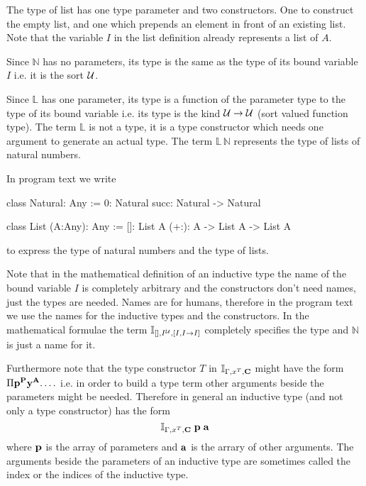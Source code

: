 \begin{description}
  The type of list has one type parameter and two constructors. One to
  construct the empty list, and one which prepends an element in front of an
  existing list. Note that the variable $I$ in the list definition already
  represents a list of $A$.

  Since $\mathbb{N}$ has no parameters, its type is the same as the type of
  its bound variable $I$ i.e. it is the sort ${\cal{U}}$.

  Since $\mathbb{L}$ has one parameter, its type is a function of the
  parameter type to the type of its bound variable i.e. its type is the kind
  ${\cal{U}} \to {\cal{U}}$ (sort valued function type). The term $\mathbb{L}$ is not a
  type, it is a type constructor which needs one argument to generate an
  actual type. The term $\mathbb{L} \, \mathbb{N}$ represents the type of
  lists of natural numbers.

  In program text we write
  \begin{alba}
      class Natural: Any
      :=
            0: Natural
            succ: Natural -> Natural

      class List (A:Any): Any :=
            []: List A
            (+:): A -> List A -> List A
  \end{alba}
  to express the type of natural numbers and the type of lists.

  Note that in the mathematical definition of an inductive type the name of
  the bound variable $I$ is completely arbitrary and the constructors don't
  need names, just the types are needed. Names are for humans, therefore in
  the program text we use the names for the inductive types and the
  constructors. In the mathematical formulae the term
  $\mathbb{I}_{[], I^{\cal{U}}, [I, I \to I]}$ completely specifies the type and
  $\mathbb{N}$ is just a name for it.

  Furthermore note that the type constructor $T$ in $\mathbb{I}_{\Gamma, x^T,
  \mathbf{C}}$ might have the form $\Pi \mathbf{p}^{\mathbf{P}} \mathbf{y}^{\mathbf{A}}. \ldots$ i.e. in
  order to build a type term other arguments beside the parameters might be
  needed.  Therefore in general an inductive type (and not only a type
  constructor) has the form $$ \mathbb{I}_{\Gamma, x^T, \mathbf{C}} \; \mathbf{p} \;
  \mathbf{a} $$ where $\mathbf{p}$ is the array of parameters and $\mathbf{a}$ is the arrary
  of other arguments. The arguments beside the parameters of an inductive type
  are sometimes called the index or the indices of the inductive type.



\end{description}
